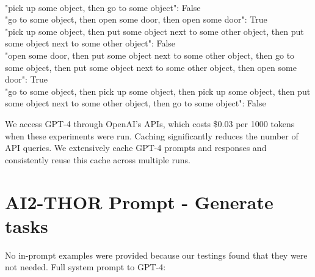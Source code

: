 \documentclass{article} %
\begin{document}
{\\"pick up some object, then go to some object": False
\\"go to some object, then open some door, then open some door": True
\\"pick up some object, then put some object next to some other object, then put some object next to some other object": False
\\"open some door, then put some object next to some other object, then go to some object, then put some object next to some other object, then open some door": True
\\"go to some object, then pick up some object, then pick up some object, then put some object next to some other object, then go to some object": False
}

We access GPT-4 through OpenAI's APIs, which costs \$0.03 per 1000 tokens when these experiments were run. Caching significantly reduces the number of API queries. We extensively cache GPT-4 prompts and responses and consistently reuse this cache across multiple runs.

\section{AI2-THOR Prompt - Generate tasks}
\label{app:prompt-thor}
No in-prompt examples were provided because our testings found that they were not needed. Full system prompt to GPT-4:
\end{document}
